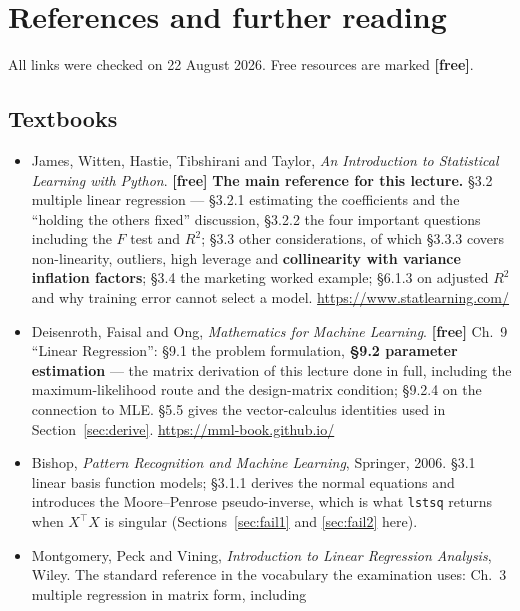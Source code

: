 \documentclass[11pt]{article}
\newcommand{\Xt}{X^{\!\top}}
\begin{document}
\section{References and further reading}

All links were checked on 22 August 2026. Free resources are marked
\textbf{[free]}.

\subsection*{Textbooks}

\begin{itemize}[leftmargin=*]
  \item James, Witten, Hastie, Tibshirani and Taylor, \emph{An Introduction to
    Statistical Learning with Python}. \textbf{[free]} \textbf{The main
    reference for this lecture.} \S3.2 multiple linear regression --- \S3.2.1
    estimating the coefficients and the ``holding the others fixed''
    discussion, \S3.2.2 the four important questions including the $F$ test
    and $R^2$; \S3.3 other considerations, of which \S3.3.3 covers
    non-linearity, outliers, high leverage and \textbf{collinearity with
    variance inflation factors}; \S3.4 the marketing worked example; \S6.1.3
    on adjusted $R^2$ and why training error cannot select a model.
    \url{https://www.statlearning.com/}
  \item Deisenroth, Faisal and Ong, \emph{Mathematics for Machine Learning}.
    \textbf{[free]} Ch.~9 ``Linear Regression'': \S9.1 the problem
    formulation, \textbf{\S9.2 parameter estimation} --- the matrix
    derivation of this lecture done in full, including the maximum-likelihood
    route and the design-matrix condition; \S9.2.4 on the connection to MLE.
    \S5.5 gives the vector-calculus identities used in
    Section~\ref{sec:derive}.
    \url{https://mml-book.github.io/}
  \item Bishop, \emph{Pattern Recognition and Machine Learning}, Springer,
    2006. \S3.1 linear basis function models; \S3.1.1 derives the normal
    equations and introduces the Moore--Penrose pseudo-inverse, which is what
    \texttt{lstsq} returns when $\Xt X$ is singular (Sections~\ref{sec:fail1}
    and \ref{sec:fail2} here).
  \item Montgomery, Peck and Vining, \emph{Introduction to Linear Regression
    Analysis}, Wiley. The standard reference in the vocabulary the
    examination uses: Ch.~3 multiple regression in matrix form, including

\end{itemize}
\end{document}

